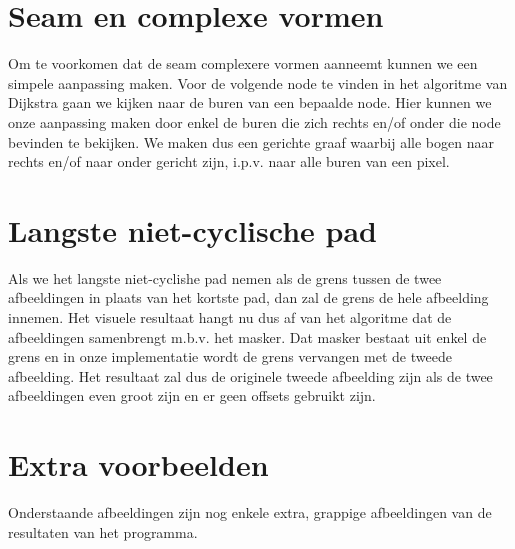 \documentclass{article}
\begin{document}
\newpage
\section{Seam en complexe vormen}
Om te voorkomen dat de seam complexere vormen aanneemt kunnen we een simpele aanpassing maken. Voor de volgende node te vinden in het algoritme
van Dijkstra gaan we kijken naar de buren van een bepaalde node. Hier kunnen we onze aanpassing maken door enkel de buren die zich rechts en/of onder
die node bevinden te bekijken. We maken dus een gerichte graaf waarbij alle bogen naar rechts en/of naar onder gericht zijn, i.p.v. naar alle buren van een pixel.

\section{Langste niet-cyclische pad}
Als we het langste niet-cyclishe pad nemen als de grens tussen de twee afbeeldingen in plaats van het kortste pad, dan zal de grens de hele
afbeelding innemen. Het visuele resultaat hangt nu dus af van het algoritme dat de afbeeldingen samenbrengt m.b.v. het masker. Dat masker bestaat
uit enkel de grens en in onze implementatie wordt de grens vervangen met de tweede afbeelding. Het resultaat zal dus de originele tweede afbeelding zijn als
de twee afbeeldingen even groot zijn en er geen offsets gebruikt zijn.

\newpage
\section{Extra voorbeelden}
Onderstaande afbeeldingen zijn nog enkele extra, grappige afbeeldingen van de resultaten van het programma.
\end{document}
